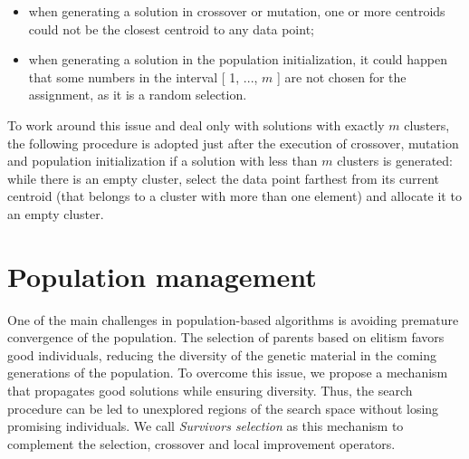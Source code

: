 \begin{itemize}
	
	\item when generating a solution in crossover or mutation, one or more centroids could not be the closest centroid to any data point;

	\item when generating a solution in the population initialization, it could happen that some numbers in the interval [ 1, ..., $m$ ] are not chosen for the assignment, as it is a random selection.
	
\end{itemize}

To work around this issue and deal only with solutions with exactly $m$ clusters, the following procedure is adopted just after the execution of crossover, mutation and population initialization if a solution with less than $m$ clusters is generated: while there is an empty cluster, select the data point farthest from its current centroid (that belongs to a cluster with more than one element) and allocate it to an empty cluster.

\section{Population management}
\label{sec:population-management}
One of the main challenges in population-based algorithms is avoiding premature convergence of the population. The selection of parents based on elitism favors good individuals, reducing the diversity of the genetic material in the coming generations of the population. To overcome this issue, we propose a mechanism that propagates good solutions while ensuring diversity. Thus, the search procedure can be led to unexplored regions of the search space without losing promising individuals. We call \textit{Survivors selection} as this mechanism to complement the selection, crossover and local improvement operators.


